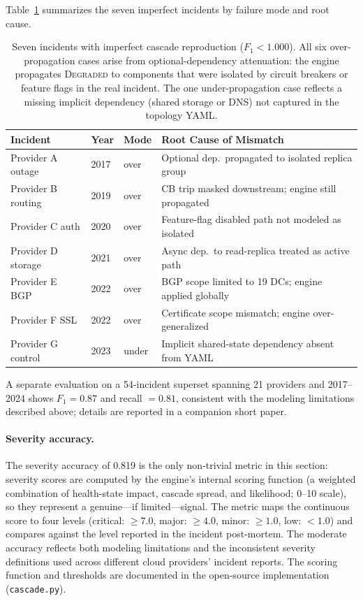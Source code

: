 \documentclass[10pt,twocolumn]{article}
\begin{document}
Table~\ref{tab:imperfect} summarizes the seven imperfect incidents by failure mode and root cause.

\begin{table}[h]
\centering
\caption{Seven incidents with imperfect cascade reproduction ($F_1 < 1.000$).
  All six over-propagation cases arise from optional-dependency attenuation:
  the engine propagates \textsc{Degraded} to components that were
  isolated by circuit breakers or feature flags in the real incident.
  The one under-propagation case reflects a missing implicit dependency
  (shared storage or DNS) not captured in the topology YAML.}
\label{tab:imperfect}
\small
\begin{tabular}{@{}lllp{5.5cm}@{}}
\toprule
\textbf{Incident} & \textbf{Year} & \textbf{Mode} & \textbf{Root Cause of Mismatch} \\
\midrule
Provider A outage  & 2017 & over  & Optional dep.\ propagated to isolated replica group \\
Provider B routing & 2019 & over  & CB trip masked downstream; engine still propagated \\
Provider C auth    & 2020 & over  & Feature-flag disabled path not modeled as isolated \\
Provider D storage & 2021 & over  & Async dep.\ to read-replica treated as active path \\
Provider E BGP     & 2022 & over  & BGP scope limited to 19 DCs; engine applied globally \\
Provider F SSL     & 2022 & over  & Certificate scope mismatch; engine over-generalized \\
Provider G control & 2023 & under & Implicit shared-state dependency absent from YAML \\
\bottomrule
\end{tabular}
\end{table}

A separate evaluation on a 54-incident superset spanning 21 providers
and 2017--2024 shows $F_1 = 0.87$ and recall $= 0.81$, consistent
with the modeling limitations described above; details are reported
in a companion short paper.

\paragraph{Severity accuracy.}
The severity accuracy of 0.819 is the only non-trivial metric in
this section: severity scores are computed by the engine's internal
scoring function (a weighted combination of health-state impact,
cascade spread, and likelihood; 0--10 scale), so they represent
a genuine---if limited---signal. The metric maps the continuous score to four levels
(critical: $\ge 7.0$, major: $\ge 4.0$, minor: $\ge 1.0$,
low: $< 1.0$) and compares against the level reported in
the incident post-mortem. The moderate accuracy
reflects both modeling limitations and the inconsistent severity
definitions used across different cloud providers' incident
reports. The scoring function and thresholds are documented
in the open-source implementation (\texttt{cascade.py}).
\end{document}
